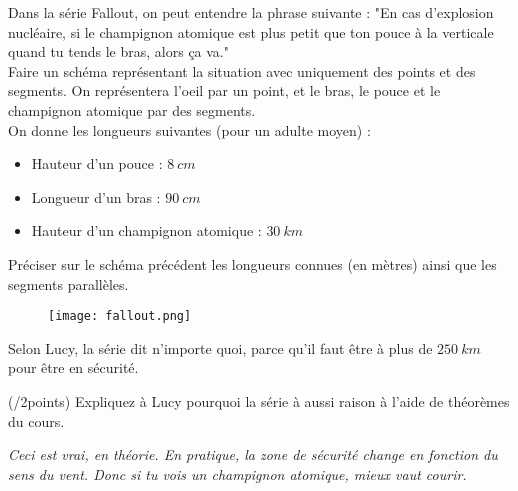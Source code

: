 \begin{minipage}[t]{0.6\textwidth}
    Dans la série Fallout, on peut entendre la phrase suivante : "En cas d'explosion nucléaire, si le champignon atomique est plus petit que ton pouce à la verticale quand tu tends le bras, alors ça va."
    \vspace{1em}\\
    \cnt Faire un schéma représentant la situation avec uniquement des points et des segments. On représentera l'oeil par un point, et le bras, le pouce et le champignon atomique par des segments.
    \vspace{1em}\\
    On donne les longueurs suivantes (pour un adulte moyen) :

\begin{itemize}
    \item Hauteur d'un pouce : $8~cm$
    \item Longueur d'un bras : $90~cm$
    \item Hauteur d'un champignon atomique : $30~km$
\end{itemize}
\vspace{1em}
\cnt Préciser sur le schéma précédent les longueurs connues (en mètres) ainsi que les segments parallèles.
\end{minipage}
\hfill
\begin{minipage}[t]{0.35\textwidth}
    \begin{figure}[H]
        \centering
        \texttt{[image: fallout.png]}
    \end{figure}
\end{minipage}
\vspace{1em}

Selon Lucy, la série dit n'importe quoi, parce qu'il faut être à plus de $250~km$ pour être en sécurité. 

\cnt (/2points) Expliquez à Lucy pourquoi la série à aussi raison à l'aide de théorèmes du cours.

\textit{Ceci est vrai, en théorie. En pratique, la zone de sécurité change en fonction du sens du vent. Donc si tu vois un champignon atomique, mieux vaut courir.}